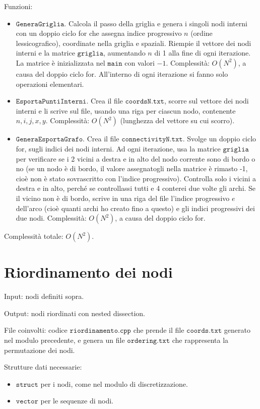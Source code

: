 \documentclass{article}
\begin{document}
Funzioni:
\begin{itemize}
\item $\texttt{GeneraGriglia}$.
Calcola il passo della griglia e genera i singoli nodi interni con un doppio ciclo for che assegna indice progressivo $n$ (ordine lessicografico), coordinate nella griglia e spaziali.
Riempie il vettore dei nodi interni e la matrice $\texttt{griglia}$, aumentando $n$ di 1 alla fine di ogni iterazione.
La matrice è inizializzata nel $\texttt{main}$ con valori $-1$.
Complessità: $O(N^2)$, a causa del doppio ciclo for.
All'interno di ogni iterazione si fanno solo operazioni elementari.

\item $\texttt{EsportaPuntiInterni}$.
Crea il file $\texttt{coordsN.txt}$, scorre sul vettore dei nodi interni e li scrive sul file, usando una riga per ciascun nodo, contenente $n,i,j,x,y$.
Complessità: $O(N^2)$ (lunghezza del vettore su cui scorro).

\item $\texttt{GeneraEsportaGrafo}$.
Crea il file $\texttt{connectivityN.txt}$.
Svolge un doppio ciclo for, sugli indici dei nodi interni.
Ad ogni iterazione, usa la matrice $\texttt{griglia}$ per verificare se i 2 vicini a destra e in alto del nodo corrente sono di bordo o no (se un nodo è di bordo, il valore assegnatogli nella matrice è rimasto -1, cioè non è stato sovrascritto con l'indice progressivo).
Controlla solo i vicini a destra e in alto, perché se controllassi tutti e 4 conterei due volte gli archi.
Se il vicino non è di bordo, scrive in una riga del file l'indice progressivo $e$ dell'arco (cioè quanti archi ho creato fino a questo) e gli indici progressivi dei due nodi.
Complessità: $O(N^2)$, a causa del doppio ciclo for.

\end{itemize}

Complessità totale: $O(N^2)$.


\section{Riordinamento dei nodi}
Input: nodi definiti sopra.

Output: nodi riordinati con nested dissection.

File coinvolti: codice $\texttt{riordinamento.cpp}$ che prende il file $\texttt{coords.txt}$ generato nel modulo precedente, e genera un file $\texttt{ordering.txt}$ che rappresenta la permutazione dei nodi.

Strutture dati necessarie:
\begin{itemize}
\item $\texttt{struct}$ per i nodi, come nel modulo di discretizzazione.
\item $\texttt{vector}$ per le sequenze di nodi.
\end{itemize}
\end{document}
